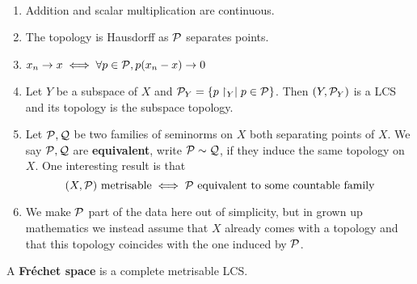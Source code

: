\documentclass{article}
\begin{document}
\begin{rmks}~

  \begin{enumerate}
    \item Addition and scalar multiplication are continuous.
    \item The topology is Hausdorff as $\mathcal P$ separates points.
    \item $x_n \rightarrow x \iff \forall p \in \mathcal P, p(x_n - x) \rightarrow 0$
    \item Let $Y$ be a subspace of $X$ and $\mathcal P_Y = \{p\restriction_Y \mid p \in \mathcal P\}$. Then $(Y, \mathcal P_Y)$ is a LCS and its topology is the subspace topology.
    \item Let $\mathcal P, \mathcal Q$ be two families of seminorms on $X$ both separating points of $X$. We say $\mathcal P, \mathcal Q$ are {\bf equivalent}, write $\mathcal P \sim \mathcal Q$, if they induce the same topology on $X$. One interesting result is that
    $$ (X, \mathcal P) \text{ metrisable} \iff \mathcal P \text{ equivalent to some countable family}$$
    \item We make $\mathcal P$ part of the data here out of simplicity, but in grown up mathematics we instead assume that $X$ already comes with a topology and that this topology coincides with the one induced by $\mathcal P$.
  \end{enumerate}
\end{rmks}

\begin{defi}
  A {\bf Fréchet space} is a complete metrisable LCS.
\end{defi}
\end{document}
